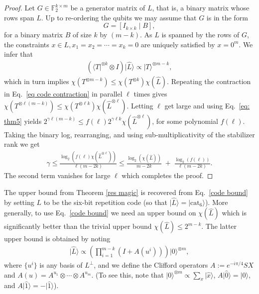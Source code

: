 \documentclass[a4paper,onecolumn,11pt,accepted=2021-11-11]{quantumarticle}
\newcommand{\hket}[1]{\ket{\hat{#1}}}
\newcommand{\cat}{\text{cat}}
\newcommand{\ket}[1]{\ensuremath{\lvert #1 \rangle}}
\newcommand{\bra}[1]{\ensuremath{\langle #1 \rvert}}
\begin{document}
\begin{proof}%
Let $G \in \mathbb{F}_2^{k \times m}$ be a generator matrix of $L$, that is, a binary matrix whose rows span $L$. Up to re-ordering the qubits we may assume that $G$ is in the form
$$
G = [I_{k \times k} \;|\; B],
$$
for a binary matrix $B$ of size $k$ by $(m-k)$.
As $L$ is spanned by the rows of $G$, the constraints $x \in L, x_1 = x_2 =  \cdots = x_k = 0$ are uniquely satisfied by $x = 0^m$. We infer that
\begin{align}\label{eq code contraction}
\left( \bra{T}^{\otimes k} \otimes I\right) \ket{\hat{L}} \propto \ket{T}^{\otimes m-k},
\end{align}
which in turn implies $\chi(T^{\otimes m-k}) \leq \chi(T^{\otimes k}) \chi(\hat{L}).$ Repeating the contraction in Eq.~\eqref{eq code contraction} in parallel $\ell$ times gives
$
\chi(T^{\otimes \ell(m-k)}) \leq \chi(T^{\otimes \ell k}) \chi(\hat{L}^{\otimes \ell}). 
$
Letting $\ell$ get large and using Eq.~\eqref{eq: thm5} yields 
$2^{\gamma\ell(m-k)} \leq f(\ell) 2^{\gamma \ell k} \chi(\hat{L}^{\otimes \ell})$, for some polynomial $f(\ell)$. Taking the binary log, rearranging, and using sub-multiplicativity of the stabilizer rank we get
\begin{align}
\gamma \leq \frac{\log_2(f(\ell)\chi(\hat{L}^{\otimes \ell}))}{\ell(m- 2k)} \leq \frac{\log_2(\chi(\hat{L}))}{m - 2k} \;+ \; \frac{\log_2(f(\ell))}{\ell(m-2k)}.
\end{align}
The second term vanishes for large $\ell$ which completes the proof.
\end{proof}
The upper bound from Theorem \ref{res magic} is recovered from Eq.~\eqref{code bound} by setting $L$ to be the six-bit repetition code (so that $\hket{L} = \ket{\cat_6}$). %
More generally, to use  Eq.~\eqref{code bound}  we need an upper bound on $\chi(\hat{L})$ which is significantly better than the trivial upper bound $\chi(\hat{L}) \leq 2^{m- k}$. The latter upper bound is obtained by noting 
\begin{align}\label{code state projection 2}
\hket{L} \propto \left( \prod_{i=1}^{m-k} (I + A(u^i)) \right) \ket{0}^{\otimes m},   
\end{align}
where $\{u^i\}$ is any basis of $L^\perp$, and we define the Clifford operators $A:= e^{-i\pi/4} S X$ and $A(u) = A^{u_1} \otimes \cdots \otimes A^{u_m}$.
(To see this, note that $\ket{0}^{\otimes m} \propto \sum_x \hket{x}$, $A\hket{0}=\hket{0}$, and $A\hket{1} = - \hket{1}$).
\end{document}
